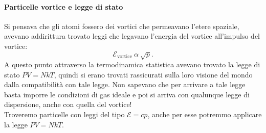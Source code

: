 \paragraph{Particelle vortice e legge di stato}%
Si pensava che gli atomi fossero dei vortici che permeavano l'etere spaziale, avevano addirittura trovato leggi che legavano l'energia del vortice all'impulso del vortice:
\[
	\mathcal{E}_{\text{vortice}} \ \alpha \ \sqrt{p} 
.\] 
A questo punto attraverso la termodinamica statistica avevano trovato la legge di stato $PV = NkT$, quindi si erano trovati rassicurati sulla loro visione del mondo dalla compatibilità con tale legge. Non sapevano che per arrivare a tale legge basta imporre le condizioni di gas ideale e poi si arriva con qualunque legge di dispersione, anche con quella del vortice!\\
Troveremo particelle con leggi del tipo $\mathcal{E} = cp$, anche per esse potremmo applicare la legge $PV = NkT$.\\

